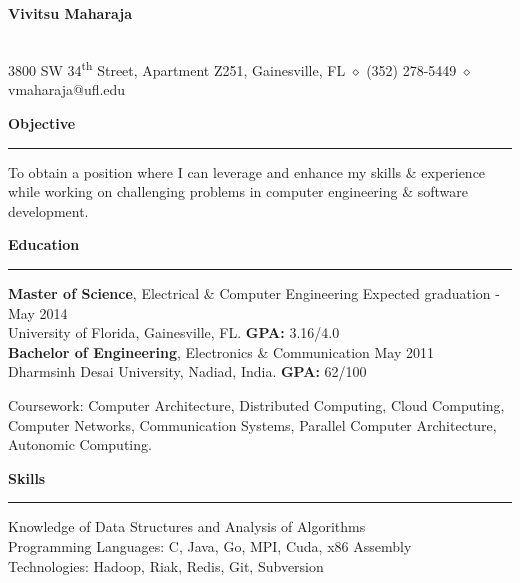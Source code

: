 \documentclass[10pt]{article}
\begin{document}
\begin{center}
\textbf{\Large Vivitsu Maharaja}
\date{}
\smallskip \\
3800 SW 34\textsuperscript{th} Street, Apartment Z251, Gainesville, FL $\diamond$ (352) 278-5449 $\diamond$ vmaharaja@ufl.edu
\end{center}

\textbf{Objective}
\smallskip
\hrule
To obtain a position where I can leverage and enhance my skills \& experience while working on challenging problems in computer engineering \& software development.

\textbf{Education}
\smallskip
\hrule
{\bf Master of Science}, Electrical \& Computer Engineering \hfill Expected graduation - May 2014\\
University of Florida, Gainesville, FL. {\bf GPA:} 3.16/4.0 \\
{\bf Bachelor of Engineering}, Electronics \& Communication \hfill May 2011\\
Dharmsinh Desai University, Nadiad, India. {\bf GPA:} 62/100

Coursework: Computer Architecture, Distributed Computing, Cloud Computing, Computer Networks, Communication Systems, Parallel Computer Architecture, Autonomic Computing.

\textbf{Skills}
\smallskip
\hrule
Knowledge of Data Structures and Analysis of Algorithms\\
Programming Languages: C, Java, Go, MPI, Cuda, x86 Assembly\\
Technologies: Hadoop, Riak, Redis, Git, Subversion
\end{document}
